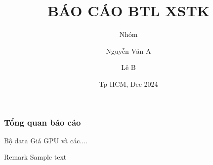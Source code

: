 \documentclass[17pt]{beamer}
\title[About Beamer] %
{BÁO CÁO BTL XSTK}
\subtitle{Nhóm}
\author[Tác giả] %
{Nguyễn Văn A\inst{1} \and Lê B\inst{2}}
\institute[HCMUT] %
{
	\inst{1}%
	Khoa KHMT\\
	HCMUT 
	\and
	\inst{2}%
	Khoa ĐIỆN\\
	HCMUT 
}
\date[NH 24-25] %
{Tp HCM, Dec 2024}
\begin{document}
	\frame{\titlepage}
	\begin{frame}
		\frametitle{Tổng quan báo cáo}
		
		Bộ data
		\alert{Giá GPU} và các....
		
		\begin{block}{Remark}
			Sample text
		\end{block}
		
	\end{frame}
\end{document}
